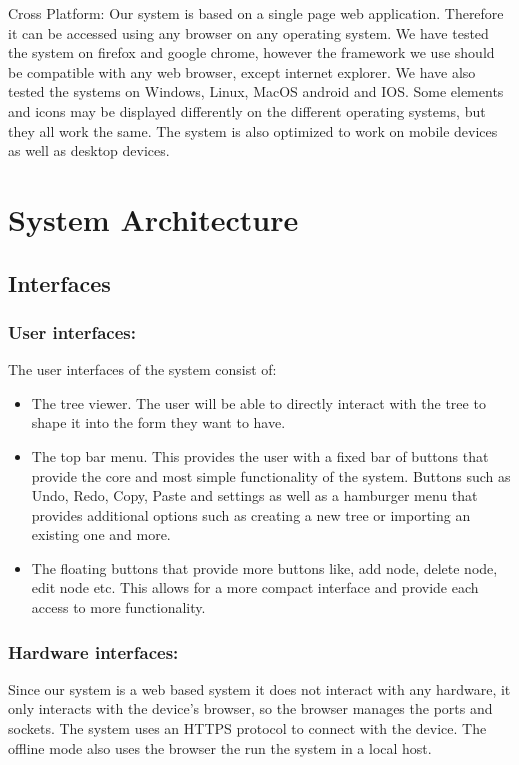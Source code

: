 \documentclass[12pt]{article}
\begin{document}
    Cross Platform:\newline 
    Our system is based on a single page web application. Therefore it can be accessed using any browser on any operating system. We have tested the system on firefox and google chrome, however the framework we use should be compatible with any web browser, except internet explorer. We have also tested the systems on Windows, Linux, MacOS android and IOS. Some elements and icons may be displayed differently on the different operating systems, but they all work the same. The system is also optimized to work on mobile devices as well as desktop devices.\newline\newline  
  
  
  \section{System Architecture}
    \subsection{Interfaces} 
      \subsubsection{User interfaces:} 
        The user interfaces of the system consist of:
        \begin{itemize}
        \item The tree viewer. The user will be able to directly interact with the tree to shape it into the form they want to have.
        \item The top bar menu. This provides the user with a fixed bar of buttons that provide the core and most simple functionality of the system. Buttons such as Undo, Redo, Copy, Paste and settings as well as a hamburger menu that provides additional options such as creating a new tree or importing an existing one and more.
        \item The floating buttons that provide more buttons like, add node, delete node, edit node etc. This allows for a more compact interface and provide each access to more functionality.
        \end{itemize}
  
      \subsubsection{Hardware interfaces:}
        Since our system is a web based system it does not interact with any hardware, it only interacts with the device's browser, so the browser manages the ports and sockets. The system uses an HTTPS protocol to connect with the device. The offline mode also uses the browser the run the system in a local host.
  
\end{document}
